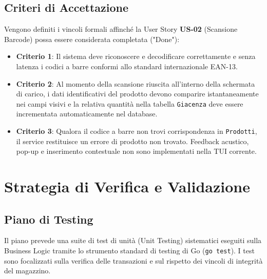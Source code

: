 \documentclass[a4paper,12pt]{article}
\begin{document}
\subsection{Criteri di Accettazione}
Vengono definiti i vincoli formali affinché la User Story \textbf{US-02} (Scansione Barcode) possa essere considerata completata ("Done"):
\begin{itemize}
    \item \textbf{Criterio 1}: Il sistema deve riconoscere e decodificare correttamente e senza latenza i codici a barre conformi allo standard internazionale EAN-13.
    \item \textbf{Criterio 2}: Al momento della scansione riuscita all'interno della schermata di carico, i dati identificativi del prodotto devono comparire istantaneamente nei campi visivi e la relativa quantità nella tabella \texttt{Giacenza} deve essere incrementata automaticamente nel database.
    \item \textbf{Criterio 3}: Qualora il codice a barre non trovi corrispondenza in \texttt{Prodotti}, il service restituisce un errore di prodotto non trovato. Feedback acustico, pop-up e inserimento contestuale non sono implementati nella TUI corrente.
\end{itemize}

\section{Strategia di Verifica e Validazione}

\subsection{Piano di Testing}
Il piano prevede una suite di test di unità (Unit Testing) sistematici eseguiti sulla Business Logic tramite lo strumento standard di testing di Go (\texttt{go test}). I test sono focalizzati sulla verifica delle transazioni e sul rispetto dei vincoli di integrità del magazzino.

\end{document}
